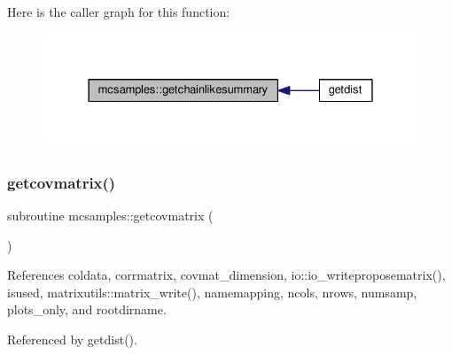 Here is the caller graph for this function\+:
\nopagebreak
\begin{figure}[H]
\begin{center}
\leavevmode
\includegraphics[width=328pt]{namespacemcsamples_a97959f867d590fadb6638910b52409bd_icgraph}
\end{center}
\end{figure}
\mbox{\label{namespacemcsamples_a3b127162be572d0864c8bd49f3403a78}} 
\subsubsection{\texorpdfstring{getcovmatrix()}{getcovmatrix()}}
{\footnotesize\ttfamily subroutine mcsamples\+::getcovmatrix (\begin{DoxyParamCaption}{ }\end{DoxyParamCaption})}



References coldata, corrmatrix, covmat\+\_\+dimension, io\+::io\+\_\+writeproposematrix(), isused, matrixutils\+::matrix\+\_\+write(), namemapping, ncols, nrows, numsamp, plots\+\_\+only, and rootdirname.



Referenced by getdist().

